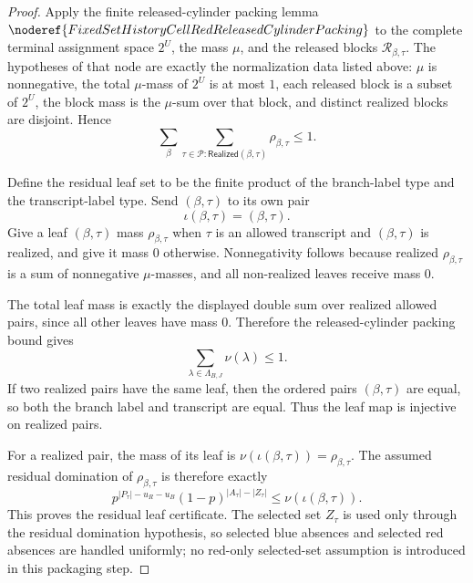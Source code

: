 \begin{proof}
Apply the finite released-cylinder packing lemma
\(\noderef{FixedSetHistoryCellRedReleasedCylinderPacking}\) to the complete
terminal assignment space \(2^U\), the mass \(\mu\), and the released blocks
\(\mathcal R_{\beta,\tau}\).  The hypotheses of that node are exactly the
normalization data listed above: \(\mu\) is nonnegative, the total
\(\mu\)-mass of \(2^U\) is at most \(1\), each released block is a subset of
\(2^U\), the block mass is the \(\mu\)-sum over that block, and distinct
realized blocks are disjoint.  Hence
\[
\sum_{\beta}
  \sum_{\tau\in\mathcal P:\mathsf{Realized}(\beta,\tau)}
    \rho_{\beta,\tau}
\le 1 .
\]

Define the residual leaf set to be the finite product of the branch-label
type and the transcript-label type.  Send \((\beta,\tau)\) to its own pair
\[
\iota(\beta,\tau)=(\beta,\tau).
\]
Give a leaf \((\beta,\tau)\) mass \(\rho_{\beta,\tau}\) when
\(\tau\) is an allowed transcript and \((\beta,\tau)\) is realized, and give
it mass \(0\) otherwise.  Nonnegativity follows because realized
\(\rho_{\beta,\tau}\) is a sum of nonnegative \(\mu\)-masses, and all
non-realized leaves receive mass \(0\).

The total leaf mass is exactly the displayed double sum over realized
allowed pairs, since all other leaves have mass \(0\).  Therefore the
released-cylinder packing bound gives
\[
\sum_{\lambda\in\Lambda_{B,J}}\nu(\lambda)\le1 .
\]
If two realized pairs have the same leaf, then the ordered pairs
\((\beta,\tau)\) are equal, so both the branch label and transcript are
equal.  Thus the leaf map is injective on realized pairs.

For a realized pair, the mass of its leaf is
\(\nu(\iota(\beta,\tau))=\rho_{\beta,\tau}\).  The assumed residual
domination of \(\rho_{\beta,\tau}\) is therefore exactly
\[
p^{|P_\tau|-u_R-u_B}(1-p)^{|A_\tau|-|Z_\tau|}
  \le \nu(\iota(\beta,\tau)).
\]
This proves the residual leaf certificate.  The selected set \(Z_\tau\) is
used only through the residual domination hypothesis, so selected blue
absences and selected red absences are handled uniformly; no red-only
selected-set assumption is introduced in this packaging step.
\end{proof}
